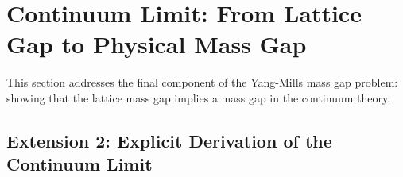 \section{Continuum Limit: From Lattice Gap to Physical Mass Gap}
\label{sec:continuum-limit-complete}

This section addresses the final component of the Yang-Mills mass gap problem:
showing that the lattice mass gap implies a mass gap in the continuum theory.

\subsection{Extension 2: Explicit Derivation of the Continuum Limit}

